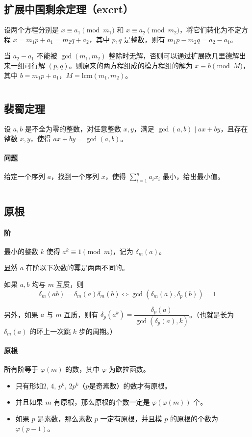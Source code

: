 \documentclass[a4paper, twoside]{article}
\begin{document}
\subsection{扩展中国剩余定理（excrt）}
设两个方程分别是 $x\equiv a_1 \pmod {m_1}$ 和 $x\equiv a_2 \pmod {m_2}$，将它们转化为不定方程 $x = m_1 p + a_1 = m_2 q + a_2$，其中 $p, q$ 是整数，则有 $m_1 p - m_2 q = a_2 - a_1$。

当 $a_2 - a_1$ 不能被 $\gcd(m_1, m_2)$ 整除时无解，否则可以通过扩展欧几里德解出来一组可行解 $(p, q)$。则原来的两方程组成的模方程组的解为 $x\equiv b\pmod M$，其中 $b = m_1 p + a_1$，$M = \text{lcm}(m_1, m_2)$。
\inputminted{cpp}{../src/数论/扩展中国剩余定理（excrt）.cpp}

\subsection{裴蜀定理}
设 $a, b$ 是不全为零的整数，对任意整数 $x, y$，满足 $\gcd(a,b) \mid ax + by$，且存在整数 $x,y$，使得 $ax+by = \gcd(a,b)$。

\paragraph{问题} 给定一个序列 $a$，找到一个序列 $x$，使得 $\sum\limits_{i=1}^{n}a_{i}x_{i}$ 最小，给出最小值。
\inputminted{cpp}{../src/数论/裴蜀定理.cpp}

\subsection{原根}
\paragraph{阶} 最小的整数 $k$ 使得 $a ^ k \equiv 1 \pmod m$，记为 $\delta_m(a)$。

显然 $a$ 在阶以下次数的幂是两两不同的。

如果 $a, b$ 均与 $m$ 互质，则
$$\delta_m(ab)=\delta_m(a)\delta_m(b) \iff \gcd\left(\delta_m(a),\delta_p(b)\right) = 1$$

另外，如果 $a$ 与 $m$ 互质，则有 $\delta_p(a^k)=\dfrac{\delta_p(a)}{\gcd\left(\delta_p(a),k\right)}$。（也就是长为 $\delta_m(a)$ 的环上一次跳 $k$ 步的周期。）

\paragraph{原根} 所有阶等于 $\varphi(m)$ 的数，其中 $\varphi$ 为欧拉函数。
\begin{itemize}
    \item 只有形如$2,\, 4,\, p^k,\, 2 p^k$（$p$是奇素数）的数才有原根。
    \item 并且如果 $m$ 有原根，那么原根的个数一定是 $\varphi\left(\varphi(m)\right)$ 个。
    \item 如果 $p$ 是素数，那么素数 $p$ 一定有原根，并且模 $p$ 的原根的个数为 $\varphi(p − 1)$。
\end{itemize}
\inputminted{cpp}{../src/数论/原根.cpp}
\end{document}

